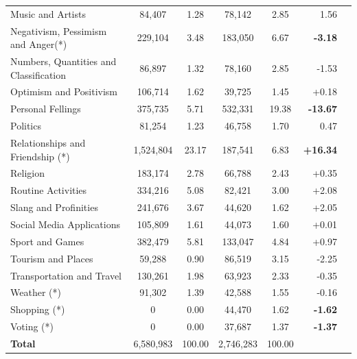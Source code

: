 \begin{table}[!ht]
{\begin{tabular}{l|S[table-format=7.0]S[table-format=2.2]|S[table-format=7.0]S[table-format=2.2]|rS[table-format=2.2]}
			Music and Artists & 84,407 & 1.28 & 78,142 & 2.85 & 1.56 \\
			Negativism, Pessimism and Anger(*) & 229,104 & 3.48 & 183,050 & 6.67 & \textbf{-3.18} \\
			Numbers, Quantities and Classification & 86,897 & 1.32 & 78,160 & 2.85 & -1.53 \\
			Optimism and Positivism & 106,714 & 1.62 & 39,725 & 1.45 & +0.18 \\
			Personal Fellings & 375,735 & 5.71 & 532,331 & 19.38 & \textbf{-13.67} \\
			Politics & 81,254 & 1.23 & 46,758 & 1.70 & 0.47 \\
			Relationships and Friendship (*) & 1,524,804 & 23.17 & 187,541 & 6.83 & \textbf{+16.34} \\
			Religion & 183,174 & 2.78 & 66,788 & 2.43 & +0.35 \\
			Routine Activities & 334,216 & 5.08 & 82,421 & 3.00 & +2.08 \\
			Slang and Profinities & 241,676 & 3.67 & 44,620 & 1.62 & +2.05 \\
			Social Media Applications & 105,809 & 1.61 & 44,073 & 1.60 & +0.01 \\
			Sport and Games & 382,479 & 5.81 & 133,047 & 4.84 & +0.97 \\
			Tourism and Places & 59,288 & 0.90 & 86,519 & 3.15 & -2.25 \\
			Transportation and Travel & 130,261 & 1.98 & 63,923 & 2.33 & -0.35 \\
			Weather (*) & 91,302 & 1.39 & 42,588 & 1.55 & -0.16 \\
			Shopping (*) & 0 & 0.00 & 44,470 & 1.62 & \textbf{-1.62} \\
			Voting (*) & 0 & 0.00 & 37,687 & 1.37 & \textbf{-1.37} \\ \hline
			\textbf{Total} & 6,580,983 & 100.00 & 2,746,283 & 100.00 &  \\			\hline
		\end{tabular}
	}
\end{table}


